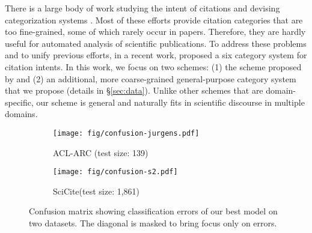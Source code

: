 \documentclass[11pt,a4paper]{article}
\newcommand{\ourdata}{SciCite\xspace}
\begin{document}
There is a large body of work studying the intent of citations and devising categorization systems \cite{stevens1965statistical,moravcsik1975some,garzone2000towards,white2004citation,ahmed2004highly,teufel2006function,agarwal2010automatically,dong2011ensemble}. Most of these efforts provide citation categories that are too fine-grained, some of which rarely occur in papers. Therefore, they are hardly useful for automated analysis of scientific publications. To address these problems and to unify previous efforts, in a recent work, \citet{jurgens2018} proposed a six category system for citation intents. In this work, we focus on two schemes: (1) the scheme proposed by \citet{jurgens2018} and (2) an additional, more coarse-grained general-purpose category system that we propose (details in \S\ref{sec:data}). Unlike other schemes that are domain-specific, our scheme is general and naturally fits in scientific discourse in multiple domains.

\begin{figure}[]
\centering
  \begin{subfigure}[b]{0.49\linewidth}
  \texttt{[image: fig/confusion-jurgens.pdf]}
  \caption{\scriptsize{ACL-ARC (test size: 139)} \label{fig:confusion-subfig1}}
    \end{subfigure}
    \begin{subfigure}[b]{0.49\linewidth}
  \texttt{[image: fig/confusion-s2.pdf]}
  \caption{\scriptsize{\ourdata (test size: 1,861)} \label{fig:confusion-subfig2} }
    \end{subfigure}
\caption{
Confusion matrix showing classification errors of our best model on two datasets. The diagonal is masked to bring focus only on errors.
}
\label{fig:confusion}
\vspace{-10pt}
\end{figure}
\end{document}
